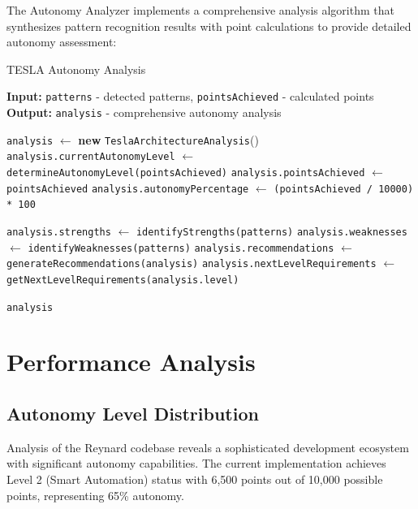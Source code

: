 \documentclass[10pt]{article}
\begin{document}
The Autonomy Analyzer implements a comprehensive analysis algorithm that synthesizes pattern recognition results with point calculations to provide detailed autonomy assessment:

\begin{algorithm}[H]
\caption{TESLA Autonomy Analysis}
\label{algo:autonomy-analysis}
\begin{algorithmic}[1]
    \State \textbf{Input:} \texttt{patterns} - detected patterns, \texttt{pointsAchieved} - calculated points
    \State \textbf{Output:} \texttt{analysis} - comprehensive autonomy analysis
    
    \State \texttt{analysis} $\gets$ \textbf{new} \texttt{TeslaArchitectureAnalysis}()
    \State \texttt{analysis.currentAutonomyLevel} $\gets$ \texttt{determineAutonomyLevel(pointsAchieved)}
    \State \texttt{analysis.pointsAchieved} $\gets$ \texttt{pointsAchieved}
    \State \texttt{analysis.autonomyPercentage} $\gets$ \texttt{(pointsAchieved / 10000) * 100}
    
    \State \texttt{analysis.strengths} $\gets$ \texttt{identifyStrengths(patterns)}
    \State \texttt{analysis.weaknesses} $\gets$ \texttt{identifyWeaknesses(patterns)}
    \State \texttt{analysis.recommendations} $\gets$ \texttt{generateRecommendations(analysis)}
    \State \texttt{analysis.nextLevelRequirements} $\gets$ \texttt{getNextLevelRequirements(analysis.level)}
    
    \State \Return \texttt{analysis}
\EndFunction
\end{algorithmic}
\end{algorithm}

\section{Performance Analysis}

\subsection{Autonomy Level Distribution}

Analysis of the Reynard codebase reveals a sophisticated development ecosystem with significant autonomy capabilities. The current implementation achieves Level 2 (Smart Automation) status with 6,500 points out of 10,000 possible points, representing 65\% autonomy.
\end{document}
